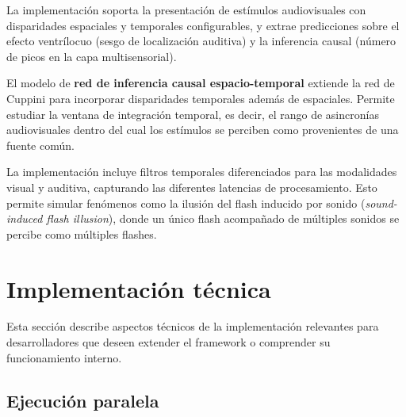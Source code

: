 La implementación soporta la presentación de estímulos audiovisuales con disparidades espaciales y temporales configurables, y extrae predicciones sobre el efecto ventrílocuo (sesgo de localización auditiva) y la inferencia causal (número de picos en la capa multisensorial).


\medskip
El modelo de \textbf{red de inferencia causal espacio-temporal} extiende la red de Cuppini para incorporar disparidades temporales además de espaciales. Permite estudiar la ventana de integración temporal, es decir, el rango de asincronías audiovisuales dentro del cual los estímulos se perciben como provenientes de una fuente común.

La implementación incluye filtros temporales diferenciados para las modalidades visual y auditiva, capturando las diferentes latencias de procesamiento. Esto permite simular fenómenos como la ilusión del flash inducido por sonido (\textit{sound-induced flash illusion}), donde un único flash acompañado de múltiples sonidos se percibe como múltiples flashes.





\section{Implementación técnica}
\label{sec:snmsi_implementacion}

Esta sección describe aspectos técnicos de la implementación relevantes para desarrolladores que deseen extender el framework o comprender su funcionamiento interno.

\subsection{Ejecución paralela}
\label{subsec:snmsi_paralelo}

